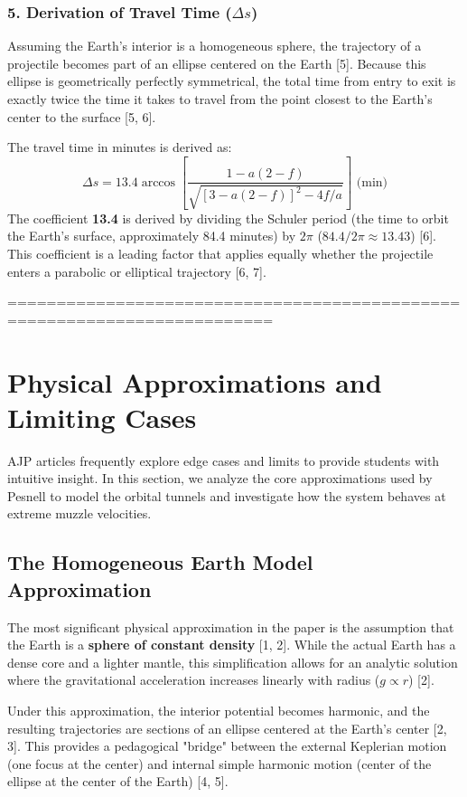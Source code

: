 \documentclass[11pt,letterpaper]{article}
\begin{document}
\subsubsection{5. Derivation of Travel Time ($\Delta s$)}
Assuming the Earth's interior is a homogeneous sphere, the trajectory of a projectile becomes part of an ellipse centered on the Earth [5]. Because this ellipse is geometrically perfectly symmetrical, the total time from entry to exit is exactly twice the time it takes to travel from the point closest to the Earth's center to the surface [5, 6].

The travel time in minutes is derived as:
\begin{equation}
    \Delta s = 13.4 \arccos \left[ \frac{1-a(2-f)}{\sqrt{[3-a(2-f)]^2 - 4f/a}} \right] \text{ (min)}
\end{equation}
The coefficient \textbf{13.4} is derived by dividing the Schuler period (the time to orbit the Earth's surface, approximately 84.4 minutes) by $2\pi$ ($84.4/2\pi \approx 13.43$) [6]. This coefficient is a leading factor that applies equally whether the projectile enters a parabolic or elliptical trajectory [6, 7].

=========================================================================
\section{Physical Approximations and Limiting Cases}
AJP articles frequently explore edge cases and limits to provide students with intuitive insight. In this section, we analyze the core approximations used by Pesnell to model the orbital tunnels and investigate how the system behaves at extreme muzzle velocities.

\subsection{The Homogeneous Earth Model Approximation}
The most significant physical approximation in the paper is the assumption that the Earth is a \textbf{sphere of constant density} [1, 2]. While the actual Earth has a dense core and a lighter mantle, this simplification allows for an analytic solution where the gravitational acceleration increases linearly with radius ($g \propto r$) [2]. 

Under this approximation, the interior potential becomes harmonic, and the resulting trajectories are sections of an ellipse centered at the Earth's center [2, 3]. This provides a pedagogical "bridge" between the external Keplerian motion (one focus at the center) and internal simple harmonic motion (center of the ellipse at the center of the Earth) [4, 5].
\end{document}
